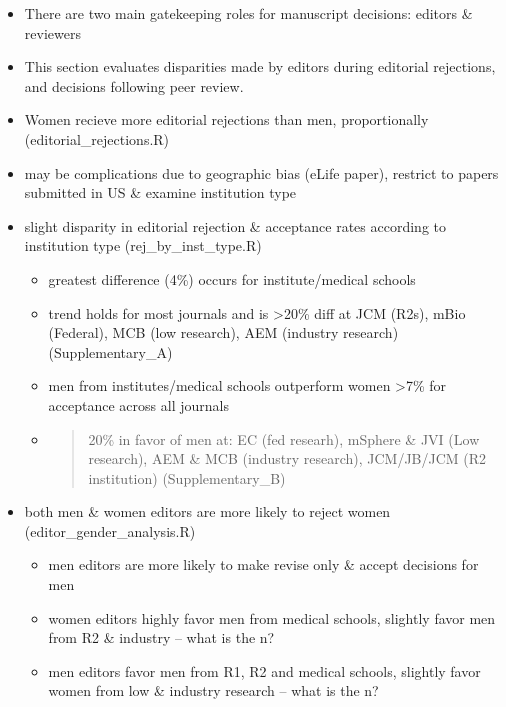 \documentclass[11pt,]{article}
\providecommand{\tightlist}{%
  \setlength{\itemsep}{0pt}\setlength{\parskip}{0pt}}
\begin{document}
\begin{itemize}
\tightlist
\item
  There are two main gatekeeping roles for manuscript decisions: editors
  \& reviewers
\item
  This section evaluates disparities made by editors during editorial
  rejections, and decisions following peer review.
\item
  Women recieve more editorial rejections than men, proportionally
  (editorial\_rejections.R)
\item
  may be complications due to geographic bias (eLife paper), restrict to
  papers submitted in US \& examine institution type
\item
  slight disparity in editorial rejection \& acceptance rates according
  to institution type (rej\_by\_inst\_type.R)

  \begin{itemize}
  \item
    greatest difference (4\%) occurs for institute/medical schools
  \item
    trend holds for most journals and is \textgreater{}20\% diff at JCM
    (R2s), mBio (Federal), MCB (low research), AEM (industry research)
    (Supplementary\_A)
  \item
    men from institutes/medical schools outperform women
    \textgreater{}7\% for acceptance across all journals
  \item
    \begin{quote}
    20\% in favor of men at: EC (fed researh), mSphere \& JVI (Low
    research), AEM \& MCB (industry research), JCM/JB/JCM (R2
    institution) (Supplementary\_B)
    \end{quote}
  \end{itemize}
\item
  both men \& women editors are more likely to reject women
  (editor\_gender\_analysis.R)

  \begin{itemize}
  \tightlist
  \item
    men editors are more likely to make revise only \& accept decisions
    for men
  \item
    women editors highly favor men from medical schools, slightly favor
    men from R2 \& industry -- what is the n?
  \item
    men editors favor men from R1, R2 and medical schools, slightly
    favor women from low \& industry research -- what is the n?
  \end{itemize}
\end{itemize}
\end{document}
